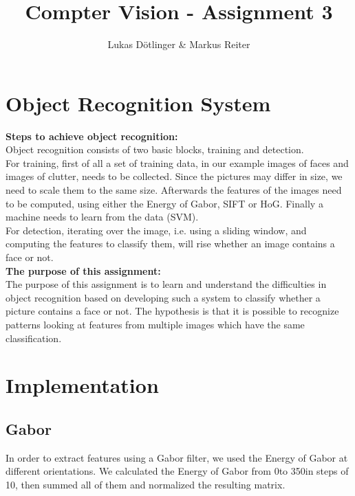 \documentclass{article}
\begin{document}
	\title{Compter Vision - Assignment 3}
	\author{Lukas Dötlinger \& Markus Reiter}

	\maketitle
	\vspace{1cm}

	\section{Object Recognition System}

	\textbf{Steps to achieve object recognition:}\\
	\newline
	Object recognition consists of two basic blocks, training and detection.\\ 
	For training, first of all a set of training data, in our example images of faces and images of clutter, needs to be collected. Since the pictures may differ in size, we need to scale them to the same size. Afterwards the features of the images need to be computed, using either the Energy of Gabor, SIFT or HoG. Finally a machine needs to learn from the data (SVM).\\
	For detection, iterating over the image, i.e. using a sliding window, and computing the features to classify them, will rise whether an image contains a face or not.\\
	\newline
	\textbf{The purpose of this assignment:}\\
	\newline
	The purpose of this assignment is to learn and understand the difficulties in object recognition based on developing such a system to classify whether a picture contains a face or not. The hypothesis is that it is possible to recognize patterns looking at features from multiple images which have the same classification.

	\newpage

  \section{Implementation}

  \subsection{Gabor}

  In order to extract features using a Gabor filter, we used the Energy of Gabor at different orientations. We calculated the Energy of Gabor from 0\textdegree to 350\textdegree in steps of 10\textdegree, then summed all of them and normalized the resulting matrix.
\end{document}
